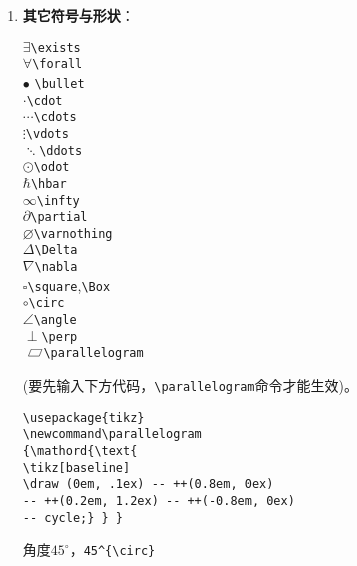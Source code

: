 \documentclass{article}
\newcommand{\q}{\quad}
\newcommand\parallelogram
{\mathord{\text{
\tikz[baseline] 
\draw (0em, .1ex)   -- ++(0.8em, 0ex) 
-- ++(0.2em, 1.2ex) -- ++(-0.8em, 0ex)
-- cycle;} } }
\begin{document}
\begin{multicols}{2}
\begin{enumerate}
\item \textbf{其它符号与形状}：
\vspace{-5mm}
\begin{multicols}{2} 
    $ \exists $\q \verb|\exists| \\
    $ \forall $\q \verb|\forall| \\    
    $ \bullet $ \q \verb|\bullet| \\
    $ \cdot $\q \verb|\cdot| \\
    $ \cdots $\q \verb|\cdots| \\
    $ \vdots $\q \verb|\vdots| \\
    $ \ddots $\q \verb|\ddots| \\
    $ \odot $\q \verb|\odot| \\
    $ \hbar $\q \verb|\hbar| \\
    $ \infty $\q \verb|\infty| \\
    $ \partial $\q \verb|\partial| \\
    $ \varnothing $\q \verb|\varnothing| \\
    $ \Delta $\q \verb|\Delta| \\
    $ \nabla $\q \verb|\nabla| \\
    $ \square $\q \verb|\square|,\verb|\Box|  \\
    $ \circ $\q \verb|\circ| \\
    $ \angle $\q \verb|\angle| \\
    $ \perp $\q \verb|\perp| \\   
    $ \parallelogram $\q \verb|\parallelogram|
\end{multicols} 
\vspace{-5mm} 
(要先输入下方代码，\verb|\parallelogram|命令才能生效)。
\begin{lstlisting}
\usepackage{tikz}
\newcommand\parallelogram
{\mathord{\text{
\tikz[baseline] 
\draw (0em, .1ex) -- ++(0.8em, 0ex) 
-- ++(0.2em, 1.2ex) -- ++(-0.8em, 0ex)
-- cycle;} } }
\end{lstlisting} 
角度$ 45^{\circ} $，\verb|45^{\circ}|


\end{enumerate}
\end{multicols}
\end{document}
